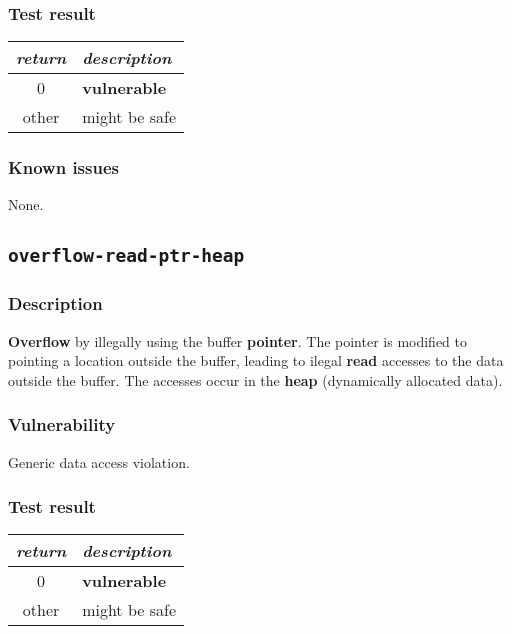 \documentclass[a4paper]{book}
\begin{document}
\subsubsection{Test result}

\begin{tabular}{cl}
  \toprule
  \emph{return}  & \emph{description} \\
  \midrule
  0              & \textbf{vulnerable} \\
  other          & might be safe \\
  \bottomrule
\end{tabular}

\subsubsection{Known issues}

None.

\newpage

\subsection{\texttt{overflow-read-ptr-heap}}\label{test-overflow-read-ptr-heap}

\subsubsection{Description}

\textbf{Overflow} by illegally using the buffer \textbf{pointer}.
The pointer is modified to pointing a location outside the buffer,
leading to ilegal \textbf{read} accesses to the data outside the buffer.
The accesses occur in the \textbf{heap} (dynamically allocated data).

\subsubsection{Vulnerability}
Generic data access violation.

\subsubsection{Test result}

\begin{tabular}{cl}
  \toprule
  \emph{return}  & \emph{description} \\
  \midrule
  0              & \textbf{vulnerable} \\
  other          & might be safe \\
  \bottomrule
\end{tabular}
\end{document}
